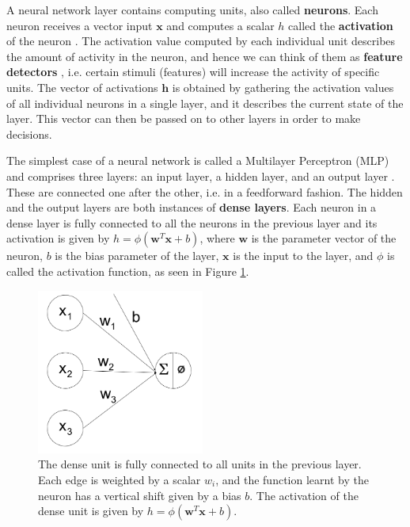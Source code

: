 \documentclass[pdftex,12pt,a4paper]{article}
\theoremstyle{definition}
\theoremstyle{remark}
\newcommand*{\V}[1]{\mathbf{#1}}%
\begin{document}
\par A neural network layer contains computing units, also called \textbf{neurons}. Each neuron receives a vector input $\V{x}$ and computes a scalar $h$ called the \textbf{activation} of the neuron \cite{Bishop2006}. The activation value computed by each individual unit describes the amount of activity in the neuron, and hence we can think of them as \textbf{feature detectors} \cite{Touretzky1989}, i.e. certain stimuli (features) will increase the activity of specific units. The vector of activations $\V{h}$ is obtained by gathering the activation values of all individual neurons in a single layer, and it describes the current state of the layer. This vector can then be passed on to other layers in order to make decisions.

\par The simplest case of a neural network is called a Multilayer Perceptron (MLP) and comprises three layers: an input layer, a hidden layer, and an output layer \cite{Bishop2006}. These are connected one after the other, i.e. in a feedforward fashion. The hidden and the output layers are both instances of \textbf{dense layers}. Each neuron in a dense layer is fully connected to all the neurons in the previous layer and its activation is given by $h = \phi(\V{w}^T\V{x} + b)$, where $\V{w}$ is the parameter vector of the neuron, $b$ is the bias parameter of the layer, $\V{x}$ is the input to the layer, and $\phi$ is called the activation function, as seen in Figure \ref{fig:neuron}.

\begin{figure}[h]
    \centering
    \includegraphics[width=5.5cm]{figs/neuron.png}
    \caption{The dense unit is fully connected to all units in the previous layer. Each edge is weighted by a scalar $w_i$, and the function learnt by the neuron has a vertical shift given by a bias $b$. The activation of the dense unit is given by $h = \phi(\V{w}^T\V{x} + b )$.}
    \label{fig:neuron} 
\end{figure} 
\end{document}
